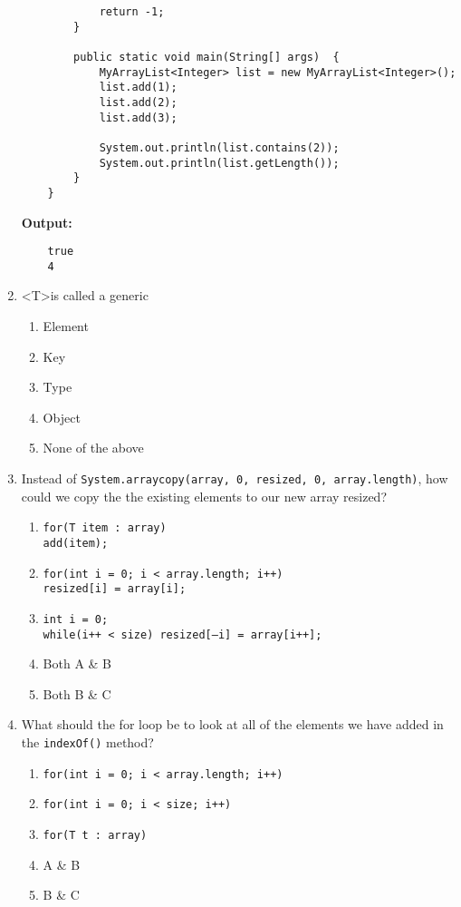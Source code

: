 \documentclass[S17-Final.tex]{subfiles}
\begin{document}
\begin{enumerate}
\begin{lstlisting}
            return -1;
        } 
        
        public static void main(String[] args)  {
            MyArrayList<Integer> list = new MyArrayList<Integer>();
            list.add(1);
            list.add(2);
            list.add(3);
            
            System.out.println(list.contains(2));
            System.out.println(list.getLength());
        }
    }
\end{lstlisting}

\textbf{Output:}
\begin{lstlisting}
    true
    4
\end{lstlisting}
\clearpage
\item \textless T\textgreater is called a generic
	
\begin{enumerate}
\item  Element
\item  Key
\item  Type \ifdraft \Ans \fi 
\item  Object
\item  None of the above
\end{enumerate}

\item Instead of \texttt{System.arraycopy(array, 0, resized, 0, array.length)}, how could we copy the the existing elements to our new array resized?
	
\begin{enumerate}
\item  \texttt{for(T item : array)\\
        add(item);}
\item  \texttt{for(int i = 0; i < array.length; i++)\\
     resized[i] = array[i];}
\item  \texttt{int i = 0;\\
  while(i++ < size)
     resized[--i] = array[i++];}
\item  Both A \& B
\item  Both B \& C \ifdraft \Ans \fi 
\end{enumerate}

\item What should the for loop be to look at all of the elements we have added in the \texttt{indexOf()} method?
	
\begin{enumerate}
\item  \texttt{for(int i = 0; i < array.length; i++)}
\item  \texttt{for(int i = 0; i < size; i++)}
\item  \texttt{for(T t : array)}
\item  A \& B
\item  B \& C \ifdraft \Ans \fi 
\end{enumerate}


\end{enumerate}
\end{document}
